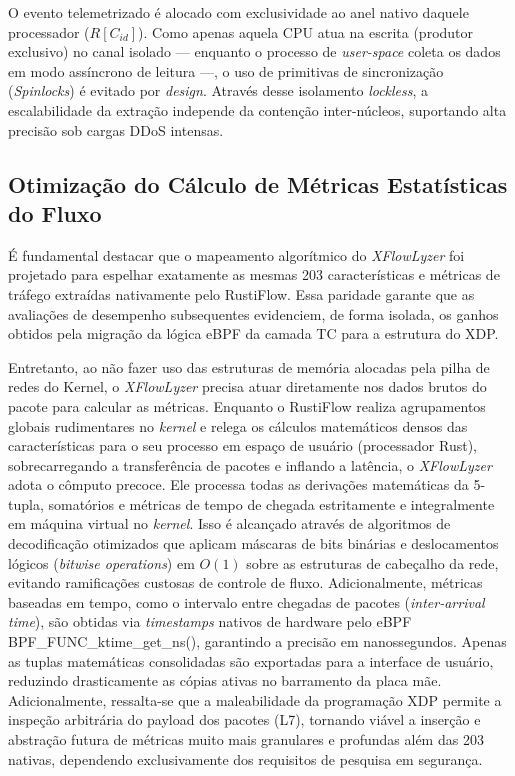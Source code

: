 \documentclass[conference]{IEEEtran}
\newcommand{\nome}{\textit{XFlowLyzer}\xspace}
\begin{document}
O evento telemetrizado é alocado com exclusividade ao anel nativo daquele processador ($R[C_{id}]$). Como apenas aquela CPU atua na escrita (produtor exclusivo) no canal isolado — enquanto o processo de \textit{user-space} coleta os dados em modo assíncrono de leitura —, o uso de primitivas de sincronização (\textit{Spinlocks}) é evitado por \textit{design}. Através desse isolamento \textit{lockless}, a escalabilidade da extração independe da contenção inter-núcleos, suportando alta precisão sob cargas DDoS intensas.

\subsection{Otimização do Cálculo de Métricas Estatísticas do Fluxo}
É fundamental destacar que o mapeamento algorítmico do \nome foi projetado para espelhar exatamente as mesmas 203 características e métricas de tráfego extraídas nativamente pelo RustiFlow. Essa paridade garante que as avaliações de desempenho subsequentes evidenciem, de forma isolada, os ganhos obtidos pela migração da lógica eBPF da camada TC para a estrutura do XDP.

Entretanto, ao não fazer uso das estruturas de memória alocadas pela pilha de redes do Kernel, o \nome precisa atuar diretamente nos dados brutos do pacote para calcular as métricas. Enquanto o RustiFlow realiza agrupamentos globais rudimentares no \textit{kernel} e relega os cálculos matemáticos densos das características para o seu processo em espaço de usuário (processador Rust), sobrecarregando a transferência de pacotes e inflando a latência, o \nome adota o cômputo precoce. Ele processa todas as derivações matemáticas da 5-tupla, somatórios e métricas de tempo de chegada estritamente e integralmente em máquina virtual no \textit{kernel}. Isso é alcançado através de algoritmos de decodificação otimizados que aplicam máscaras de bits binárias e deslocamentos lógicos (\textit{bitwise operations}) em $O(1)$ sobre as estruturas de cabeçalho da rede, evitando ramificações custosas de controle de fluxo. Adicionalmente, métricas baseadas em tempo, como o intervalo entre chegadas de pacotes (\textit{inter-arrival time}), são obtidas via \textit{timestamps} nativos de hardware pelo eBPF BPF\_FUNC\_ktime\_get\_ns(), garantindo a precisão em nanossegundos. Apenas as tuplas matemáticas consolidadas são exportadas para a interface de usuário, reduzindo drasticamente as cópias ativas no barramento da placa mãe. Adicionalmente, ressalta-se que a maleabilidade da programação XDP permite a inspeção arbitrária do payload dos pacotes (L7), tornando viável a inserção e abstração futura de métricas muito mais granulares e profundas além das 203 nativas, dependendo exclusivamente dos requisitos de pesquisa em segurança.
\end{document}
